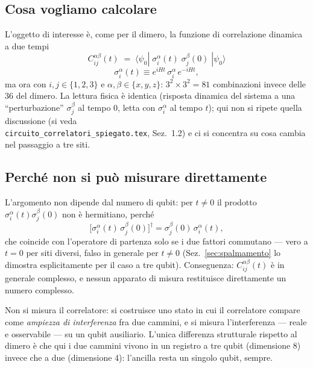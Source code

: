 \documentclass[11pt,a4paper]{article}
\begin{document}
\subsection{Cosa vogliamo calcolare}

L'oggetto di interesse è, come per il dimero, la funzione di correlazione dinamica a due tempi
\begin{equation}
\boxed{\;C_{ij}^{\alpha\beta}(t) \;=\; \langle\psi_0|\;\sigma_i^\alpha(t)\;\sigma_j^\beta(0)\;|\psi_0\rangle\;}
\label{eq:Cdef}
\end{equation}
\begin{equation}
\sigma_i^\alpha(t)\equiv e^{iHt}\,\sigma_i^\alpha\,e^{-iHt},
\end{equation}
ma ora con $i,j\in\{1,2,3\}$ e $\alpha,\beta\in\{x,y,z\}$: $3^2\times3^2=81$ combinazioni invece
delle $36$ del dimero. La lettura fisica è identica (risposta dinamica del sistema a una
``perturbazione'' $\sigma_j^\beta$ al tempo $0$, letta con $\sigma_i^\alpha$ al tempo $t$); qui non
si ripete quella discussione (si veda\\ \texttt{circuito\_correlatori\_spiegato.tex}, Sez.~1.2) e ci
si concentra su cosa cambia nel passaggio a tre siti.

\subsection{Perché non si può misurare direttamente}

L'argomento non dipende dal numero di qubit: per $t\neq0$ il prodotto
$\sigma_i^\alpha(t)\sigma_j^\beta(0)$ non è hermitiano, perché
\begin{equation}
\big[\sigma_i^\alpha(t)\,\sigma_j^\beta(0)\big]^\dagger
= \sigma_j^\beta(0)\,\sigma_i^\alpha(t),
\end{equation}
che coincide con l'operatore di partenza solo se i due fattori commutano --- vero a $t=0$ per siti
diversi, falso in generale per $t\neq0$ (Sez.~\ref{sec:spalmamento} lo dimostra esplicitamente per
il caso a tre qubit). Conseguenza: $C_{ij}^{\alpha\beta}(t)$ è in generale complesso, e nessun
apparato di misura restituisce direttamente un numero complesso.

\begin{ideabox}
Non si misura il correlatore: si costruisce uno stato in cui il correlatore compare come
\emph{ampiezza di interferenza} fra due cammini, e si misura l'interferenza --- reale e
osservabile --- su un qubit ausiliario. L'unica differenza strutturale rispetto al dimero è che
qui i due cammini vivono in un registro a tre qubit (dimensione 8) invece che a due (dimensione
4): l'ancilla resta un singolo qubit, sempre.
\end{ideabox}
\end{document}
